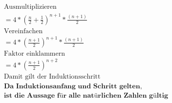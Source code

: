 \documentclass{article}
\begin{document}
\begin{enumerate}[label = (\alph*)]
\begin{gather*}
                    \text{Ausmultiplizieren} \\
                    = 4 * {\left( \frac{n}{2} + \frac{1}{2} \right)}^{n+1} * \frac{(n + 1)}{2} \\
                    \text{Vereinfachen} \\
                    = 4 * {\left( \frac{n+1}{2} \right)}^{n+1} * \frac{(n + 1)}{2} \\
                    \text{Faktor einklammern} \\
                    = 4 * {\left( \frac{n+1}{2} \right) }^{n+2} \\
                    \text{Damit gilt der Induktionsschritt} \\
                    \textbf{Da Induktionsanfang und Schritt gelten,} \\
                    \textbf{ist die Aussage für alle natürlichen Zahlen gültig}
                \end{gather*}
        \end{enumerate}
\end{document}
